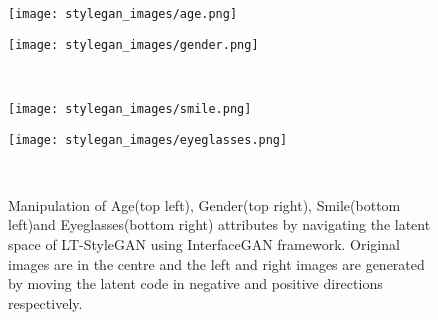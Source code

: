 \documentclass[10pt,twocolumn,letterpaper]{article}
\begin{document}
\begin{figure*}[t]
\centering
    \begin{minipage}{.45\textwidth}
\texttt{[image: stylegan\_images/age.png]}

\end{minipage}\hspace{0.5cm}
    \begin{minipage}{.45\textwidth}
\texttt{[image: stylegan\_images/gender.png]}

\end{minipage}\\
    \vspace{0.2cm}
    \begin{minipage}{.45\textwidth}
\texttt{[image: stylegan\_images/smile.png]}

\end{minipage}\hspace{0.5cm}
    \begin{minipage}{.45\textwidth}
\texttt{[image: stylegan\_images/eyeglasses.png]}

\end{minipage}\\
    \caption{\footnotesize{Manipulation of Age(top left), Gender(top right), Smile(bottom left)and Eyeglasses(bottom right) attributes by navigating the latent space of LT-StyleGAN using InterfaceGAN \cite{interface2020shen} framework. Original images are in the centre and the left and right images are generated by moving the latent code in negative and positive directions respectively.}}
    \label{fig:lt-stylegan}
\end{figure*}


\vspace{-8pt}
\end{document}
